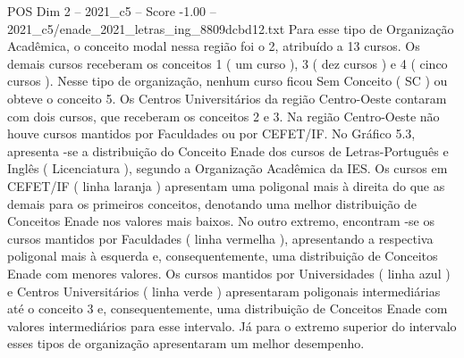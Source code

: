 \begin{textsample}{POS Dim 2 – 2021\_c5 – Score -1.00 – 2021\_c5/enade\_2021\_letras\_ing\_8809dcbd12.txt}
Para esse tipo de Organização Acadêmica, o conceito modal nessa região foi o 2, atribuído a 13 cursos.
Os demais cursos receberam os conceitos 1 ( um curso ), 3 ( dez cursos ) e 4 ( cinco cursos ).
Nesse tipo de organização, nenhum curso ficou Sem Conceito ( SC ) ou obteve o conceito 5.
Os Centros Universitários da região Centro-Oeste contaram com dois cursos, que receberam os conceitos 2 e 3.
Na região Centro-Oeste não houve cursos mantidos por Faculdades ou por CEFET/IF.
No Gráfico 5.3, apresenta -se a distribuição do Conceito Enade dos cursos de Letras-Português e Inglês ( Licenciatura ), segundo a Organização Acadêmica da IES.
Os cursos em CEFET/IF ( linha laranja ) apresentam uma poligonal mais à direita do que as demais para os primeiros conceitos, denotando uma melhor distribuição de Conceitos Enade nos valores mais baixos.
No outro extremo, encontram -se os cursos mantidos por Faculdades ( linha vermelha ), apresentando a respectiva poligonal mais à esquerda e, consequentemente, uma distribuição de Conceitos Enade com menores valores.
Os cursos mantidos por Universidades ( linha azul ) e Centros Universitários ( linha verde ) apresentaram poligonais intermediárias até o conceito 3 e, consequentemente, uma distribuição de Conceitos Enade com valores intermediários para esse intervalo.
Já para o extremo superior do intervalo esses tipos de organização apresentaram um melhor desempenho.

\end{textsample}
